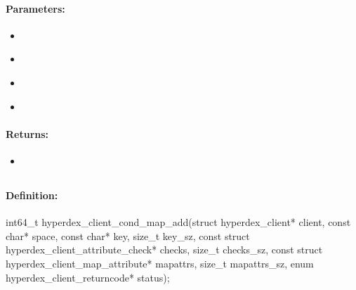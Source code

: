 \paragraph{Parameters:}
\begin{itemize}[noitemsep]
\item {}\\

\item {}\\

\item {}\\

\item {}\\

\end{itemize}

\paragraph{Returns:}
\begin{itemize}[noitemsep]
\item {}\\

\end{itemize}

\pagebreak
\subsection{}
\label{api:c:cond_map_add}


\paragraph{Definition:}
\begin{ccode}
int64_t hyperdex_client_cond_map_add(struct hyperdex_client* client,
        const char* space,
        const char* key, size_t key_sz,
        const struct hyperdex_client_attribute_check* checks, size_t checks_sz,
        const struct hyperdex_client_map_attribute* mapattrs, size_t mapattrs_sz,
        enum hyperdex_client_returncode* status);
\end{ccode}

